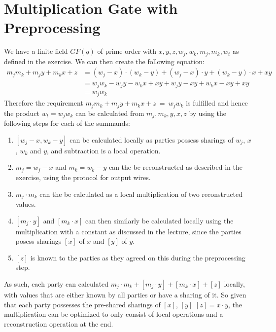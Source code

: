 \documentclass{report}
\begin{document}
	\section{Multiplication Gate with Preprocessing}
	\startsection
		We have a finite field $GF(q)$ of prime order with $x,y,z,w_j, w_k, m_j, m_k, w_t$ as defined in the exercise. We can then create the following equation:
		\begin{align*}
			m_j m_k + m_j y + m_k x + z & = (w_j - x) \cdot (w_k - y) + (w_j - x) \cdot y + (w_k - y) \cdot x + xy \\
			& = w_j w_k - w_j y - w_k x + xy + w_j y - xy + w_k x - xy + xy \\
			& = w_j w_k
		\end{align*}
		Therefore the requirement $m_j m_k + m_j y + m_k x + z \ = \ w_j w_k$ is fulfilled and hence the product $w_t = w_j w_k$ can be calculated from $m_j, m_k, y, x, z$ by using the following steps for each of the summands:
		\begin{enumerate}[]
			\item $\left[w_j - x, w_k - y\right]$ can be calculated locally as parties possess sharings of $w_j$, $x$, $w_k$ and $y$, and subtraction is a local operation.
			\item $m_j = w_j - x$ and $m_k = w_k - y$ can the be reconstructed as described in the exercise, using the protocol for output wires.
			\item $m_j \cdot m_k$ can the be calculated as a local multiplication of two reconstructed values.
			\item $[m_j \cdot y]$ and $[m_k \cdot x]$ can then similarly be calculated locally using the multiplication with a constant as discussed in the lecture, since the parties posess sharings $[x]$ of $x$ and $[y]$ of $y$.
			\item $[z]$ is known to the parties as they agreed on this during the preprocessing step.
		\end{enumerate}
		As such, each party can calculated $m_j \cdot m_k + [m_j \cdot y] + [m_k \cdot x] + [z]$ locally, with values that are either known by all parties or have a sharing of it. So given that each party possesses the pre-shared sharings of $[x]$, $[y]$ $[z] = x \cdot y$, the multiplication can be optimized to only consist of local operations and a reconstruction operation at the end.
	\closesection
\end{document}
